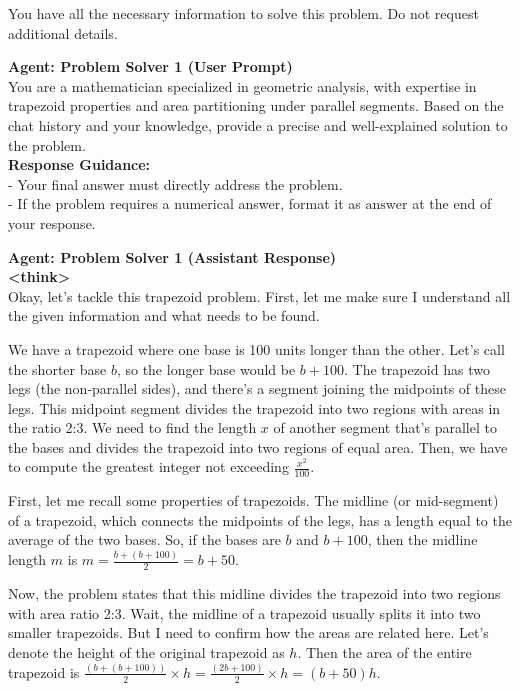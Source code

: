 \begin{tcolorbox}[
  title=Multiagent Collaborative Reasoning Trace Data Sample,
  breakable,
  colback=white,
  colframe=black
]
You have all the necessary information to solve this problem. Do not request additional details.

\textcolor{olivegreen}{\textbf{Agent: Problem Solver 1 (User Prompt)}} \\
You are a mathematician specialized in geometric analysis, with expertise in trapezoid properties and area partitioning under parallel segments. Based on the chat history and your knowledge, provide a precise and well-explained solution to the problem. \\[2ex]

\textbf{Response Guidance:} \\[1ex]
- Your final answer must directly address the problem. \\
- If the problem requires a numerical answer, format it as $\boxed{\text{answer}}$ at the end of your response.

\textcolor{olivegreen}{\textbf{Agent: Problem Solver 1 (Assistant Response)}} \\
\textbf{\textless think\textgreater} \\

Okay, let's tackle this trapezoid problem. First, let me make sure I understand all the given information and what needs to be found.

We have a trapezoid where one base is 100 units longer than the other. Let's call the shorter base \( b \), so the longer base would be \( b + 100 \). The trapezoid has two legs (the non-parallel sides), and there's a segment joining the midpoints of these legs. This midpoint segment divides the trapezoid into two regions with areas in the ratio 2:3. We need to find the length \( x \) of another segment that's parallel to the bases and divides the trapezoid into two regions of equal area. Then, we have to compute the greatest integer not exceeding \( \frac{x^2}{100} \).

First, let me recall some properties of trapezoids. The midline (or mid-segment) of a trapezoid, which connects the midpoints of the legs, has a length equal to the average of the two bases. So, if the bases are \( b \) and \( b + 100 \), then the midline length \( m \) is \( m = \frac{b + (b + 100)}{2} = b + 50 \).

Now, the problem states that this midline divides the trapezoid into two regions with area ratio 2:3. Wait, the midline of a trapezoid usually splits it into two smaller trapezoids. But I need to confirm how the areas are related here. Let's denote the height of the original trapezoid as \( h \). Then the area of the entire trapezoid is \( \frac{(b + (b + 100))}{2} \times h = \frac{(2b + 100)}{2} \times h = (b + 50)h \).


\end{tcolorbox}
